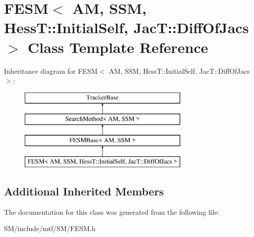 \hypertarget{classFESM_3_01AM_00_01SSM_00_01HessT_1_1InitialSelf_00_01JacT_1_1DiffOfJacs_01_4}{\section{F\-E\-S\-M$<$ A\-M, S\-S\-M, Hess\-T\-:\-:Initial\-Self, Jac\-T\-:\-:Diff\-Of\-Jacs $>$ Class Template Reference}
\label{classFESM_3_01AM_00_01SSM_00_01HessT_1_1InitialSelf_00_01JacT_1_1DiffOfJacs_01_4}
}
Inheritance diagram for F\-E\-S\-M$<$ A\-M, S\-S\-M, Hess\-T\-:\-:Initial\-Self, Jac\-T\-:\-:Diff\-Of\-Jacs $>$\-:\begin{figure}[H]
\begin{center}
\leavevmode
\includegraphics[height=4.000000cm]{classFESM_3_01AM_00_01SSM_00_01HessT_1_1InitialSelf_00_01JacT_1_1DiffOfJacs_01_4}
\end{center}
\end{figure}
\subsection*{Additional Inherited Members}


The documentation for this class was generated from the following file\-:\begin{DoxyCompactItemize}
\item 
S\-M/include/mtf/\-S\-M/F\-E\-S\-M.\-h\end{DoxyCompactItemize}
